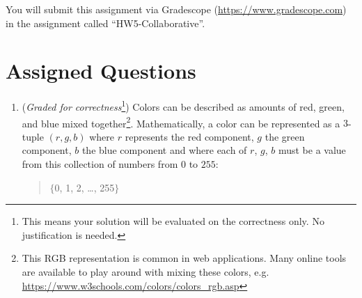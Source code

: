 \documentclass[12pt, oneside]{article}
\begin{document}
You will submit this assignment via Gradescope
(\href{https://www.gradescope.com}{https://www.gradescope.com}) in the assignment called ``HW5-Collaborative''.


\newpage
\section*{Assigned Questions}
\begin{enumerate}
\item ({\it Graded for correctness}\footnote{This means your solution will be evaluated on the correctness only. No justification is needed.}) Colors can be described as amounts of red, green, and blue mixed together\footnote{This RGB representation
is common in web applications.  Many online tools are available to play around with mixing these colors, e.g. \url{https://www.w3schools.com/colors/colors_rgb.asp}}.  Mathematically, a color can be represented as a $3$-tuple $(r, g, b)$ where $r$
represents the red component, $g$ the green component, $b$ the blue component and where each of $r$, $g$, $b$ must
be a value from this collection of numbers from $0$ to $255$:
\label{sets_colors}
\begin{quote}
$\{$0, 1, 2, \ldots, 255$\}$
\end{quote}


\end{enumerate}
\end{document}
